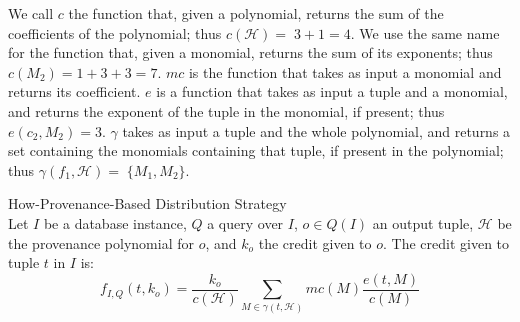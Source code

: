 We call $c$ the function that, given a polynomial, returns the sum of the coefficients of the polynomial; thus $c(\mathcal{H})=\;3+1=4$. We use the same name for the function that, given a monomial, returns the sum of its exponents; thus $c(M_2)=1+3+3=7$. 
$mc$ is the function that takes as input a monomial and returns its coefficient. $e$ is a function that takes as input a tuple and a monomial, and returns the exponent of the tuple in the monomial, if present; thus $e(c_2, M_2)=3$. $\gamma$ takes as input a tuple and the whole polynomial, and returns a set containing the monomials containing that tuple, if present in the polynomial; thus $\gamma(f_1, \mathcal{H})=\;\{M_1, M_2\}$. 

\begin{definition}{How-Provenance-Based Distribution Strategy}
    \label{def:how_distribution}\\
    Let $I$ be a database instance, $Q$ a query over $I$, $o \in Q(I)$ an output tuple, $\mathcal{H}$ be the provenance polynomial for $o$, and $k_o$ the credit given to $o$.
    The credit given to tuple $t$ in $I$ is:
    \[
    f_{I, Q}(t, k_o) = \frac{k_o}{c(\mathcal{H})} \sum_{M \in \gamma(t, \mathcal{H})} mc(M) \frac{e(t, M)}{c(M)}
    \]
\end{definition}

